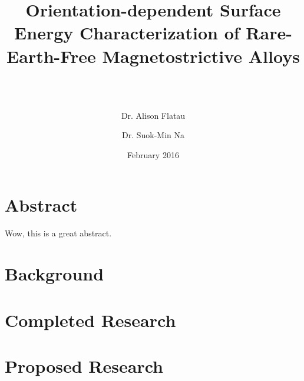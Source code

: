 \documentclass[12pt,letterpaper]{article}
\title{\textbf{Orientation-dependent Surface Energy Characterization of Rare-Earth-Free Magnetostrictive Alloys}}
\author{\makebox[.9\textwidth]{\textbf{Michael N. Van Order}\thanks{Funded by the NSF}}\\~\\
	\and Dr. Alison Flatau\\
	\and Dr. Suok-Min Na\\
}
\date{February 2016}
\begin{document}
	
\begin{titlepage}
	\maketitle
\end{titlepage}


\section*{Abstract}
	Wow, this is a great abstract. 

\section{Background}




\section{Completed Research}



\section{Proposed Research}








\end{document}
